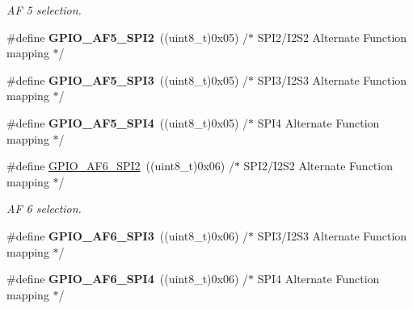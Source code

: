 \begin{DoxyCompactItemize}
\begin{DoxyCompactList}\small\item\em AF 5 selection. \end{DoxyCompactList}\item 
\#define {\bfseries G\+P\+I\+O\+\_\+\+A\+F5\+\_\+\+S\+P\+I2}~((uint8\+\_\+t)0x05)  /$\ast$ S\+P\+I2/\+I2\+S2 Alternate Function mapping   $\ast$/\hypertarget{group___g_p_i_o___alternate__function__selection_ga0f61d8c59eaf80aec23bbe58c64bc11d}{}\label{group___g_p_i_o___alternate__function__selection_ga0f61d8c59eaf80aec23bbe58c64bc11d}

\item 
\#define {\bfseries G\+P\+I\+O\+\_\+\+A\+F5\+\_\+\+S\+P\+I3}~((uint8\+\_\+t)0x05)  /$\ast$ S\+P\+I3/\+I2\+S3 Alternate Function mapping   $\ast$/\hypertarget{group___g_p_i_o___alternate__function__selection_ga6f153ff6680bf07a86191671b89cc583}{}\label{group___g_p_i_o___alternate__function__selection_ga6f153ff6680bf07a86191671b89cc583}

\item 
\#define {\bfseries G\+P\+I\+O\+\_\+\+A\+F5\+\_\+\+S\+P\+I4}~((uint8\+\_\+t)0x05)  /$\ast$ S\+P\+I4 Alternate Function mapping        $\ast$/\hypertarget{group___g_p_i_o___alternate__function__selection_gae906bb43a748bb865cb7a721d2c5d14e}{}\label{group___g_p_i_o___alternate__function__selection_gae906bb43a748bb865cb7a721d2c5d14e}

\item 
\#define \hyperlink{group___g_p_i_o___alternate__function__selection_ga1da9c47feac80dcd9b9b9e3ca0d8f07e}{G\+P\+I\+O\+\_\+\+A\+F6\+\_\+\+S\+P\+I2}~((uint8\+\_\+t)0x06)  /$\ast$ S\+P\+I2/\+I2\+S2 Alternate Function mapping  $\ast$/\hypertarget{group___g_p_i_o___alternate__function__selection_ga1da9c47feac80dcd9b9b9e3ca0d8f07e}{}\label{group___g_p_i_o___alternate__function__selection_ga1da9c47feac80dcd9b9b9e3ca0d8f07e}

\begin{DoxyCompactList}\small\item\em AF 6 selection. \end{DoxyCompactList}\item 
\#define {\bfseries G\+P\+I\+O\+\_\+\+A\+F6\+\_\+\+S\+P\+I3}~((uint8\+\_\+t)0x06)  /$\ast$ S\+P\+I3/\+I2\+S3 Alternate Function mapping  $\ast$/\hypertarget{group___g_p_i_o___alternate__function__selection_gad229e64449bd2a2162c3d283e794a4e4}{}\label{group___g_p_i_o___alternate__function__selection_gad229e64449bd2a2162c3d283e794a4e4}

\item 
\#define {\bfseries G\+P\+I\+O\+\_\+\+A\+F6\+\_\+\+S\+P\+I4}~((uint8\+\_\+t)0x06)  /$\ast$ S\+P\+I4 Alternate Function mapping       $\ast$/\hypertarget{group___g_p_i_o___alternate__function__selection_ga61df826c6b9185e99862164044f3f5de}{}\label{group___g_p_i_o___alternate__function__selection_ga61df826c6b9185e99862164044f3f5de}


\end{DoxyCompactItemize}
